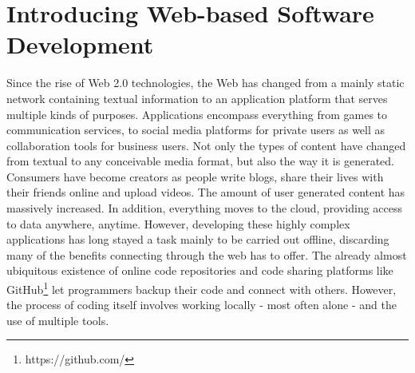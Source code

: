 \section{Introducing Web-based Software Development}
\label{sec:Introduction}

	
	
Since the rise of Web 2.0 technologies, the Web has changed from a mainly static network containing textual information
to an application platform that serves multiple kinds of purposes.
Applications encompass everything from games to communication services, to social media platforms for private users
as well as collaboration tools for business users.
Not only the types of content have changed from textual to any conceivable media format, but also the way it is generated.
Consumers have become creators as people write blogs, share their lives with their friends online and upload videos.
The amount of user generated content has massively increased. In addition, everything moves to the cloud,
providing access to data anywhere, anytime.
However, developing these highly complex applications has long stayed a task mainly to be carried out offline,
discarding many of the benefits connecting through the web has to offer.
The already almost ubiquitous existence of online code repositories and code sharing platforms like
GitHub\footnote{https://github.com/} let programmers backup their code and connect with others.
However, the process of coding itself involves working locally - most often alone - and the use of multiple tools.

